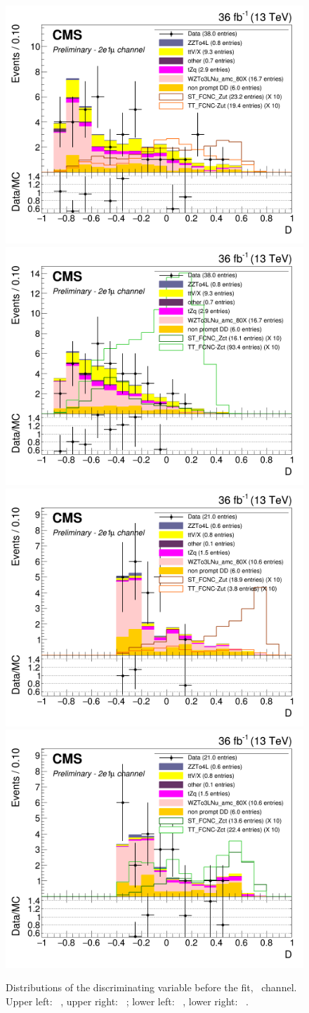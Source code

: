 \begin{figure}[ht]
	\centering
	  \includegraphics[width=0.39\linewidth]{6_Search/Figures/BDTunweighted/toppair_Zut_BDT_eeu_Stack}
	  \includegraphics[width=0.39\linewidth]{6_Search/Figures/BDTunweighted/toppair_Zct_BDT_eeu_Stack}
	  \includegraphics[width=0.39\linewidth]{6_Search/Figures/BDTunweighted/singletop_Zut_BDT_eeu_Stack}
	  \includegraphics[width=0.39\linewidth]{6_Search/Figures/BDTunweighted/singletop_Zct_BDT_eeu_Stack}
	\caption{Distributions of the discriminating variable before the fit, \eemu\  channel. Upper left: \TTSR\ \Zut , upper right: \TTSR\ \Zct ; lower left: \STSR\  \Zut , lower right: \STSR\  \Zct .}
	\label{fig:bdteeustack}
\end{figure}



